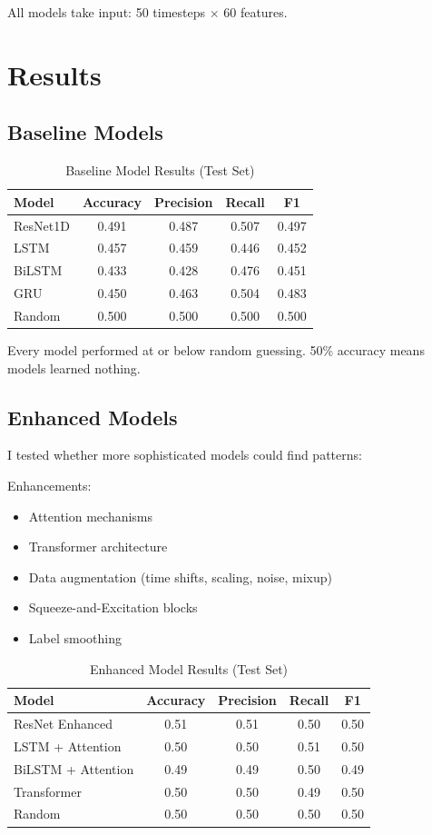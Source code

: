 \documentclass[11pt,a4paper]{article}
\begin{document}
All models take input: 50 timesteps $\times$ 60 features.

\section{Results}

\subsection{Baseline Models}

\begin{table}[H]
\centering
\caption{Baseline Model Results (Test Set)}
\begin{tabular}{lcccc}
\toprule
Model & Accuracy & Precision & Recall & F1 \\
\midrule
ResNet1D & 0.491 & 0.487 & 0.507 & 0.497 \\
LSTM & 0.457 & 0.459 & 0.446 & 0.452 \\
BiLSTM & 0.433 & 0.428 & 0.476 & 0.451 \\
GRU & 0.450 & 0.463 & 0.504 & 0.483 \\
Random & 0.500 & 0.500 & 0.500 & 0.500 \\
\bottomrule
\end{tabular}
\end{table}

Every model performed at or below random guessing. 50\% accuracy means models learned nothing.

\subsection{Enhanced Models}

I tested whether more sophisticated models could find patterns:

\noindent Enhancements:
\begin{itemize}
\item Attention mechanisms
\item Transformer architecture
\item Data augmentation (time shifts, scaling, noise, mixup)
\item Squeeze-and-Excitation blocks
\item Label smoothing
\end{itemize}

\begin{table}[H]
\centering
\caption{Enhanced Model Results (Test Set)}
\begin{tabular}{lcccc}
\toprule
Model & Accuracy & Precision & Recall & F1 \\
\midrule
ResNet Enhanced & 0.51 & 0.51 & 0.50 & 0.50 \\
LSTM + Attention & 0.50 & 0.50 & 0.51 & 0.50 \\
BiLSTM + Attention & 0.49 & 0.49 & 0.50 & 0.49 \\
Transformer & 0.50 & 0.50 & 0.49 & 0.50 \\
Random & 0.50 & 0.50 & 0.50 & 0.50 \\
\bottomrule
\end{tabular}
\end{table}
\end{document}
